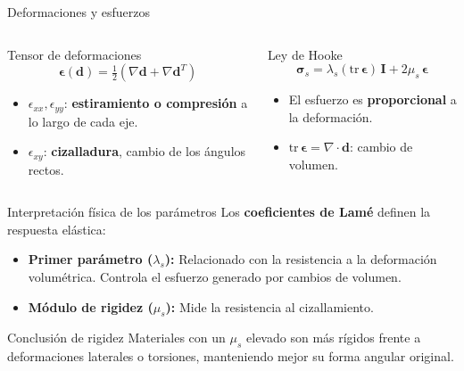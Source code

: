 \begin{frame}{Deformaciones y esfuerzos}
  \begin{columns}[T]
      \begin{block}{Tensor de deformaciones}
        \[
          \boldsymbol{\epsilon}(\mathbf{d}) = \tfrac{1}{2}\left(\nabla\mathbf{d} + \nabla\mathbf{d}^T\right)
        \]
        \begin{itemize}\small
          \item $\epsilon_{xx}, \epsilon_{yy}$: \textbf{estiramiento o compresión} a lo largo de cada eje.
          \item $\epsilon_{xy}$: \textbf{cizalladura}, cambio de los ángulos rectos.
        \end{itemize}
      \end{block}
      \begin{block}{Ley de Hooke}
        \[
          \boldsymbol{\sigma}_s = \lambda_s (\text{tr}\,\boldsymbol{\epsilon})\,\mathbf{I} + 2\mu_s\,\boldsymbol{\epsilon}
        \]
        \begin{itemize}\small
          \item El esfuerzo es \textbf{proporcional} a la deformación.
          \item $\text{tr}\,\boldsymbol{\epsilon} = \nabla\cdot\mathbf{d}$: cambio de volumen.
        \end{itemize}
      \end{block}
  \end{columns}
\end{frame}

\begin{frame}{Interpretación física de los parámetros}
Los \textbf{coeficientes de Lamé} definen la respuesta elástica:

\begin{itemize}
    \item \textbf{Primer parámetro ($\lambda_s$):} Relacionado con la resistencia a la deformación volumétrica. Controla el esfuerzo generado por cambios de volumen.
    \item \textbf{Módulo de rigidez ($\mu_s$):} Mide la resistencia al cizallamiento. 
\end{itemize}

\begin{exampleblock}{Conclusión de rigidez}
Materiales con un $\mu_s$ elevado son más rígidos frente a deformaciones laterales o torsiones, manteniendo mejor su forma angular original.
\end{exampleblock}
\end{frame}

